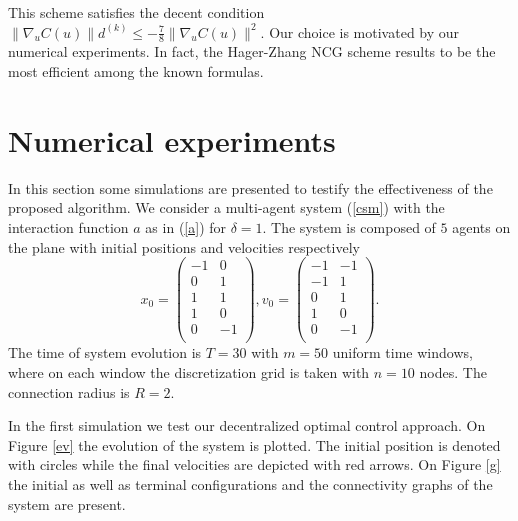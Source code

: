 \documentclass[a4paper,10pt, english]{article}
\begin{document}
  This scheme satisfies the decent condition $\|\nabla_u C(u)\|d^{(k)} \leq -\frac{7}{8}\|\nabla_u C(u)\|^2$. Our choice is motivated by our numerical experiments. In fact, the Hager-Zhang NCG scheme results to be the most efficient among the known formulas. 
  
  
 
 
 \newpage
 \section{Numerical experiments}
In this section some simulations are presented to testify the effectiveness of the proposed algorithm. We consider a multi-agent system (\ref{csm}) with the interaction function 
$a$ as in (\ref{a}) for $\delta = 1$. The system is composed of $5$
agents on the plane with initial positions and velocities respectively
\[x_0 =  \left( \begin{array}{cc}
		  -1  &   0\\
           0  &   1\\
           1  &   1\\
           1  &   0\\
           0 &   -1\\
\end{array} \right),
%
v_0 = 
\left( \begin{array}{cc}
	     -1&  -1\\
	     -1&   1\\
	      0&   1\\
	      1&   0\\
	      0&  -1\\
\end{array} \right).
\]
The time of system evolution is $T = 30$ with  $m = 50$ uniform time windows, where  on each window the discretization grid
is taken with $n = 10$ nodes.  The connection radius is $R = 2$. 

In the first simulation we test our decentralized optimal control approach. On Figure \ref{ev} the evolution of the system is plotted. The initial position
is denoted with circles while the final velocities are depicted with red arrows. On Figure \ref{g} the initial as well as terminal configurations and the connectivity graphs of the system are present.
\end{document}
